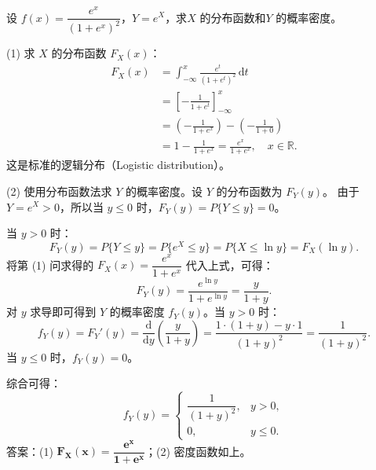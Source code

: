 ﻿\documentclass[lang=cn,11pt]{elegantbook}
\begin{document}
\begin{exercise}[逻辑分布变换] \label{exer:2-50}
设 $f(x)=\dfrac{e^x}{(1+e^x)^2}$，$Y=e^X$，求$X$ 的分布函数和$Y$ 的概率密度。
\end{exercise}
\begin{solution}
(1) 求 $X$ 的分布函数 $F_X(x)$：
\begin{align*}
F_X(x) &= \int_{-\infty}^{x} \frac{e^t}{(1+e^t)^2}\,\mathrm{d}t \\
&= \left[-\frac{1}{1+e^t}\right]_{-\infty}^{x} \\
&= \left(-\frac{1}{1+e^x}\right) - \left(-\frac{1}{1+0}\right) \\
&= 1 - \frac{1}{1+e^x} = \frac{e^x}{1+e^x}, \quad x\in\mathbb{R}.
\end{align*}
这是标准的逻辑分布（Logistic distribution）。

(2) 使用分布函数法求 $Y$ 的概率密度。设 $Y$ 的分布函数为 $F_Y(y)$。
由于 $Y = e^X > 0$，所以当 $y \le 0$ 时，$F_Y(y) = P\{Y \le y\} = 0$。

当 $y > 0$ 时：
\[
F_Y(y) = P\{Y \le y\} = P\{e^X \le y\} = P\{X \le \ln y\} = F_X(\ln y).
\]
将第 (1) 问求得的 $F_X(x) = \dfrac{e^x}{1+e^x}$ 代入上式，可得：
\[
F_Y(y) = \frac{e^{\ln y}}{1+e^{\ln y}} = \frac{y}{1+y}.
\]
对 $y$ 求导即可得到 $Y$ 的概率密度 $f_Y(y)$。当 $y > 0$ 时：
\[
f_Y(y) = F_Y'(y) = \frac{\mathrm{d}}{\mathrm{d}y} \left( \frac{y}{1+y} \right) = \frac{1 \cdot (1+y) - y \cdot 1}{(1+y)^2} = \frac{1}{(1+y)^2}.
\]
当 $y \le 0$ 时，$f_Y(y) = 0$。

综合可得：
\[
f_Y(y)=
\begin{cases}
\dfrac{1}{(1+y)^2}, & y>0, \\[8pt]
0, & y\leqslant0.
\end{cases}
\]
答案：(1) $\boldsymbol{F_X(x)=\dfrac{e^x}{1+e^x}}$；(2) 密度函数如上。
\end{solution}
\end{document}
